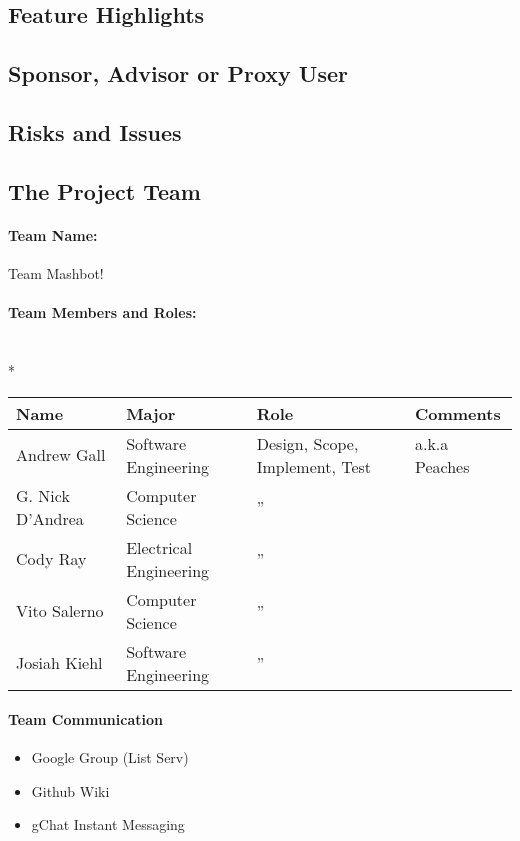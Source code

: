 \documentclass{article}
\begin{document}
\subsection*{Feature Highlights}

\subsection*{Sponsor, Advisor or Proxy User}

\subsection*{Risks and Issues}
\subsection*{The Project Team}
\paragraph{Team Name:} Team Mashbot!
\paragraph{Team Members and Roles:} \hspace*{\fill} \\*
\begin{tabular}{|l|l|l|l|}
\hline
Name & Major & Role & Comments \\ \hline
Andrew Gall & Software Engineering & Design, Scope, Implement, Test & a.k.a Peaches \\ \hline
G. Nick D'Andrea & Computer Science & \hspace*{\fill}''\hspace*{\fill} &  \\ \hline
Cody Ray & Electrical Engineering & \hspace*{\fill}''\hspace*{\fill} &  \\ \hline
Vito Salerno & Computer Science & \hspace*{\fill}''\hspace*{\fill} &  \\ \hline
Josiah Kiehl & Software Engineering & \hspace*{\fill}''\hspace*{\fill} & \\ \hline
\end{tabular}

\paragraph{Team Communication}
\begin{itemize}
  \item Google Group (List Serv)
  \item Github Wiki
  \item gChat Instant Messaging
\end{itemize}
\end{document}
